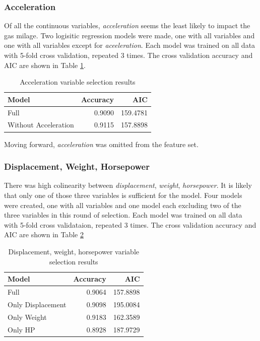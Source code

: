 \documentclass[12pt,letterpaper]{article}
\begin{document}
\subsubsection*{Acceleration}
Of all the continuous variables, \textit{acceleration} seems the least likely to impact the gas milage. Two logisitic regression models were made, one with all variables and one with all variables except for \textit{aceeleration}. Each model was trained on all data with 5-fold cross validation, repeated 3 times. The cross validation accuracy and AIC are shown in Table \ref{tab:accel_varsel}. 

\begin{table}[hbt!]
  \caption{\label{tab:accel_varsel}Acceleration variable selection results}
  \centering
  \begin{tabular}{|l|r|r|}
  \hline
  Model & Accuracy & AIC\\
  \hline
  Full & 0.9090 & 159.4781\\
  \hline
  Without Acceleration & 0.9115 & 157.8898\\
  \hline
  \end{tabular}
\end{table}

Moving forward, \textit{acceleration} was omitted from the feature set.

\subsubsection*{Displacement, Weight, Horsepower}
There was high colinearity between \textit{displacement}, \textit{weight}, \textit{horsepower}. It is likely that only one of those three variables is sufficient for the model. Four models were created, one with all variables and one model each excluding two of the three variables in this round of selection. Each model was trained on all data with 5-fold cross validataion, repeated 3 times. The cross validation accuracy and AIC are shown in Table \ref{tab:dwh_varsel}

\begin{table}[hbt!]
  \caption{\label{tab:dwh_varsel}Displacement, weight, horsepower variable selection results}
  \centering
  \begin{tabular}{|l|r|r|}
  \hline
  Model & Accuracy & AIC\\
  \hline
  Full & 0.9064 & 157.8898\\
  \hline
  Only Displacement & 0.9098 & 195.0084\\
  \hline
  Only Weight & 0.9183 & 162.3589\\
  \hline
  Only HP & 0.8928 & 187.9729\\
  \hline
  \end{tabular}
 \end{table}
\end{document}
